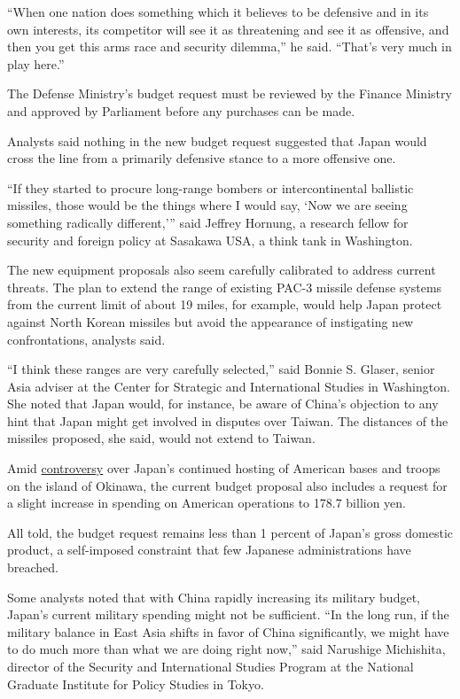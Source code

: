 ``When one nation does something which it believes to be defensive and
in its own interests, its competitor will see it as threatening and see
it as offensive, and then you get this arms race and security dilemma,''
he said. ``That's very much in play here.''

The Defense Ministry's budget request must be reviewed by the Finance
Ministry and approved by Parliament before any purchases can be made.

Analysts said nothing in the new budget request suggested that Japan
would cross the line from a primarily defensive stance to a more
offensive one.

``If they started to procure long-range bombers or intercontinental
ballistic missiles, those would be the things where I would say, `Now we
are seeing something radically different,''' said Jeffrey Hornung, a
research fellow for security and foreign policy at Sasakawa USA, a think
tank in Washington.

The new equipment proposals also seem carefully calibrated to address
current threats. The plan to extend the range of existing PAC-3 missile
defense systems from the current limit of about 19 miles, for example,
would help Japan protect against North Korean missiles but avoid the
appearance of instigating new confrontations, analysts said.

``I think these ranges are very carefully selected,'' said Bonnie S.
Glaser, senior Asia adviser at the Center for Strategic and
International Studies in Washington. She noted that Japan would, for
instance, be aware of China's objection to any hint that Japan might get
involved in disputes over Taiwan. The distances of the missiles
proposed, she said, would not extend to Taiwan.

Amid
\href{http://www.nytimes.com/2016/06/05/world/asia/okinawa-murder-case-heightens-outcry-over-us-militarys-presence.html}{controversy}
over Japan's continued hosting of American bases and troops on the
island of Okinawa, the current budget proposal also includes a request
for a slight increase in spending on American operations to 178.7
billion yen.

All told, the budget request remains less than 1 percent of Japan's
gross domestic product, a self-imposed constraint that few Japanese
administrations have breached.

Some analysts noted that with China rapidly increasing its military
budget, Japan's current military spending might not be sufficient. ``In
the long run, if the military balance in East Asia shifts in favor of
China significantly, we might have to do much more than what we are
doing right now,'' said Narushige Michishita, director of the Security
and International Studies Program at the National Graduate Institute for
Policy Studies in Tokyo.

